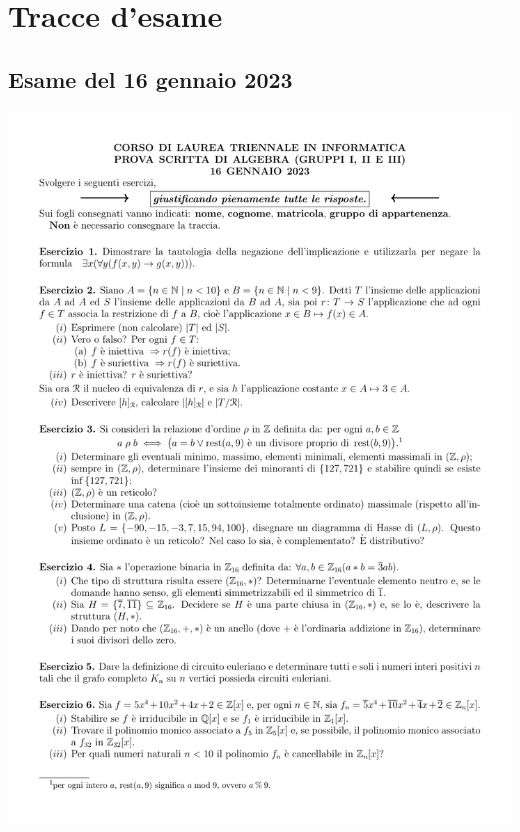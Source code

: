 \chapter{Tracce d'esame}
\section{Esame del 16 gennaio 2023}
\begin{center}
	\includegraphics[scale=.85]{pdf/23-01-16.pdf}
\end{center}
